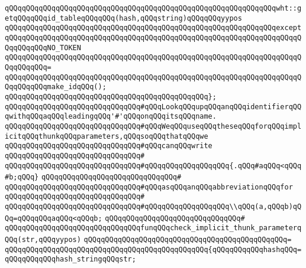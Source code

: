 \newline
\verb|qQQqqQQqqQQqqQQqqQQqqQQqqQQqqQQqqQQqqQQqqQQqqQQqqQQqqQQqqQQqqQQqwht::getqQQqqQQqid_tableqQQqqQQq(hash,qQQqstring)qQQqqQQqyypos|\newline
\verb|qQQqqQQqqQQqqQQqqQQqqQQqqQQqqQQqqQQqqQQqqQQqqQQqqQQqqQQqqQQqqQQqexcept|\newline
\verb|qQQqqQQqqQQqqQQqqQQqqQQqqQQqqQQqqQQqqQQqqQQqqQQqqQQqqQQqqQQqqQQqqQQqqQQqqQQqqQQqNO_TOKEN|\newline
\verb|qQQqqQQqqQQqqQQqqQQqqQQqqQQqqQQqqQQqqQQqqQQqqQQqqQQqqQQqqQQqqQQqqQQqqQQqqQQqqQQq=|\newline
\verb|qQQqqQQqqQQqqQQqqQQqqQQqqQQqqQQqqQQqqQQqqQQqqQQqqQQqqQQqqQQqqQQqqQQqqQQqqQQqqQQqmake_idqQQq();|\newline
\verb|qQQqqQQqqQQqqQQqqQQqqQQqqQQqqQQqqQQqqQQqqQQqqQQq};|\newline
\newline
\verb|qQQqqQQqqQQqqQQqqQQqqQQqqQQqqQQq#qQQqLookqQQqupqQQqanqQQqidentifierqQQqwithqQQqaqQQqleadingqQQq'#'qQQqonqQQqitsqQQqname.|\newline
\verb|qQQqqQQqqQQqqQQqqQQqqQQqqQQqqQQq#qQQqWeqQQquseqQQqtheseqQQqforqQQqimplicitqQQqthunkqQQqparameters,qQQqsoqQQqthatqQQqwe|\newline
\verb|qQQqqQQqqQQqqQQqqQQqqQQqqQQqqQQq#qQQqcanqQQqwrite|\newline
\verb|qQQqqQQqqQQqqQQqqQQqqQQqqQQqqQQq#|\newline
\verb|qQQqqQQqqQQqqQQqqQQqqQQqqQQqqQQq#qQQqqQQqqQQqqQQqqQQq{.qQQq#aqQQq<qQQq#b;qQQq}|\newline
\verb|qQQqqQQqqQQqqQQqqQQqqQQqqQQqqQQq#|\newline
\verb|qQQqqQQqqQQqqQQqqQQqqQQqqQQqqQQq#qQQqasqQQqanqQQqabbreviationqQQqfor|\newline
\verb|qQQqqQQqqQQqqQQqqQQqqQQqqQQqqQQq#|\newline
\verb|qQQqqQQqqQQqqQQqqQQqqQQqqQQqqQQq#qQQqqQQqqQQqqQQqqQQq\\qQQq(a,qQQqb)qQQq=qQQqqQQqaqQQq<qQQqb;|\newline
\verb|qQQqqQQqqQQqqQQqqQQqqQQqqQQqqQQq#|\newline
\verb|qQQqqQQqqQQqqQQqqQQqqQQqqQQqqQQqfunqQQqcheck_implicit_thunk_parameterqQQq(str,qQQqyypos)|\newline
\verb|qQQqqQQqqQQqqQQqqQQqqQQqqQQqqQQqqQQqqQQqqQQqqQQq=|\newline
\verb|qQQqqQQqqQQqqQQqqQQqqQQqqQQqqQQqqQQqqQQqqQQqqQQq{qQQqqQQqqQQqhashqQQq=qQQqqQQqqQQqhash_stringqQQqstr;|\newline

